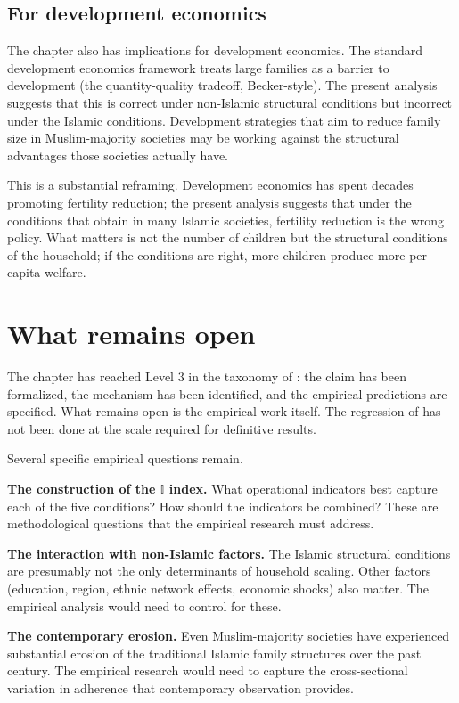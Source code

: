 \subsection{For development economics}

The chapter also has implications for development economics. The
standard development economics framework treats large families as
a barrier to development (the quantity-quality tradeoff,
Becker-style). The present analysis suggests that this is correct
under non-Islamic structural conditions but incorrect under the
Islamic conditions. Development strategies that aim to reduce
family size in Muslim-majority societies may be working against
the structural advantages those societies actually have.

This is a substantial reframing. Development economics has spent
decades promoting fertility reduction; the present analysis
suggests that under the conditions that obtain in many Islamic
societies, fertility reduction is the wrong policy. What matters is
not the number of children but the structural conditions of the
household; if the conditions are right, more children produce more
per-capita welfare.

\section{What remains open}
\label{sec:network-open}

The chapter has reached Level 3 in the taxonomy of :
the claim has been formalized, the mechanism has been identified,
and the empirical predictions are specified. What remains open is
the empirical work itself. The regression of 
has not been done at the scale required for definitive results.

Several specific empirical questions remain.

\textbf{The construction of the $\mathbb{I}$ index.} What
operational indicators best capture each of the five conditions?
How should the indicators be combined? These are methodological
questions that the empirical research must address.

\textbf{The interaction with non-Islamic factors.} The Islamic
structural conditions are presumably not the only determinants of
household scaling. Other factors (education, region, ethnic
network effects, economic shocks) also matter. The empirical
analysis would need to control for these.

\textbf{The contemporary erosion.} Even Muslim-majority societies
have experienced substantial erosion of the traditional Islamic
family structures over the past century. The empirical research
would need to capture the cross-sectional variation in adherence
that contemporary observation provides.

